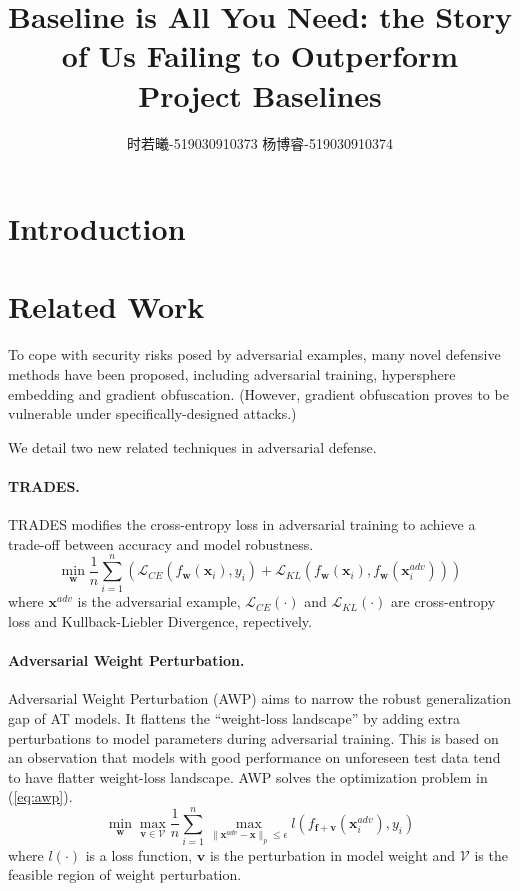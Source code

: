 \documentclass{article}
\title{Baseline is All You Need: the Story of Us Failing to Outperform Project Baselines}
\author{时若曦-519030910373 \quad 杨博睿-519030910374}
\date{}
\begin{document}
\maketitle
\section{Introduction}\label{sec:Intro}


\section{Related Work}\label{sec:RelatedWork}
    To cope with security risks posed by adversarial examples, many novel defensive methods have been proposed, including adversarial training, hypersphere embedding and gradient obfuscation. (However, gradient obfuscation proves to be vulnerable under specifically-designed attacks.)

    We detail two new related techniques in adversarial defense.
    \paragraph{TRADES.} TRADES modifies the cross-entropy loss in adversarial training to achieve a trade-off between accuracy and model robustness.
    \begin{equation}\label{eq:trades}
        \min_{\mathbf{w}} \frac{1}{n}\sum_{i=1}^n \left( \mathcal{L}_{CE}\left( f_{\mathbf{w}}(\mathbf{x}_i), y_i \right) + \mathcal{L}_{KL}\left(f_{\mathbf{w}}(\mathbf{x}_i), f_{\mathbf{w}}(\mathbf{x}_i^{adv})\right) \right)
    \end{equation}
    where $\mathbf{x}^{adv}$ is the adversarial example, $\mathcal{L}_{CE}(\cdot)$ and $\mathcal{L}_{KL}(\cdot)$ are cross-entropy loss and Kullback-Liebler Divergence, repectively.

    \paragraph{Adversarial Weight Perturbation.} Adversarial Weight Perturbation (AWP) aims to narrow the robust generalization gap of AT models. It flattens the ``weight-loss landscape'' by adding extra perturbations to model parameters during adversarial training. This is based on an observation that models with good performance on unforeseen test data tend to have flatter weight-loss landscape. AWP solves the optimization problem in (\ref{eq:awp}).
    \begin{equation}\label{eq:awp}
        \min_{\mathbf{w}} \max_{\mathbf{v} \in \mathcal{V}} \frac{1}{n}\sum_{i=1}^n \max_{\|\mathbf{x}^{adv} - \mathbf{x}\|_p \le \epsilon} l(f_{\mathbf{f}+\mathbf{v}}(\mathbf{x}^{adv}_i), y_i)
    \end{equation}
    where $l(\cdot)$ is a loss function, $\mathbf{v}$ is the perturbation in model weight and $\mathcal{V}$ is the feasible region of weight perturbation.
 
\end{document}
